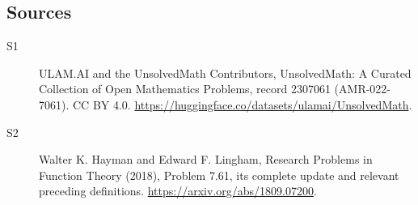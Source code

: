 \documentclass[11pt]{article}
\begin{document}
\subsection{Sources}
\begin{description}
\item[\hypertarget{source:2307061:1}{S1}] ULAM.AI and the UnsolvedMath Contributors, UnsolvedMath: A Curated Collection of Open Mathematics Problems, record 2307061 (AMR-022-7061). CC BY 4.0. \url{https://huggingface.co/datasets/ulamai/UnsolvedMath}.
\item[\hypertarget{source:2307061:2}{S2}] Walter K. Hayman and Edward F. Lingham, Research Problems in Function Theory (2018), Problem 7.61, its complete update and relevant preceding definitions. \url{https://arxiv.org/abs/1809.07200}.
\end{description}
\label{end:2307061}
\end{document}
